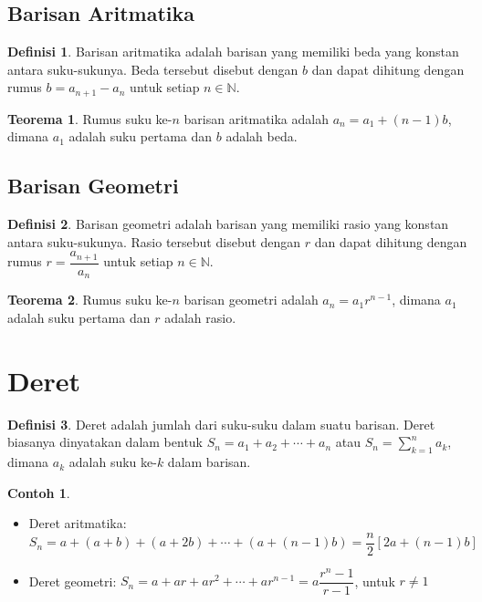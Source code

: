 \documentclass[aspectratio=169]{beamer}
\theoremstyle{definition}
\newtheorem{definisi}{Definisi}
\newtheorem{teorema}{Teorema}
\newtheorem{contoh}{Contoh}
\newcommand{\N}{\mathbb{N}}
\begin{document}
\subsection{Barisan Aritmatika}
\begin{frame}{\insertsection}{\insertsubsection}
  \begin{definisi}
    Barisan aritmatika adalah barisan yang memiliki beda yang konstan antara suku-sukunya. Beda tersebut disebut dengan $b$ dan dapat dihitung dengan rumus $b = a_{n+1} - a_n$ untuk setiap $n\in\N$.
  \end{definisi}
  \begin{teorema}
    Rumus suku ke-$n$ barisan aritmatika adalah $a_n = a_1 + (n-1)b$, dimana $a_1$ adalah suku pertama dan $b$ adalah beda.
  \end{teorema}
\end{frame}

\subsection{Barisan Geometri}
\begin{frame}{\insertsection}{\insertsubsection}
  \begin{definisi}
    Barisan geometri adalah barisan yang memiliki rasio yang konstan antara suku-sukunya. Rasio tersebut disebut dengan $r$ dan dapat dihitung dengan rumus $r = \dfrac{a_{n+1}}{a_n}$ untuk setiap $n\in\N$.
  \end{definisi}
  \begin{teorema}
    Rumus suku ke-$n$ barisan geometri adalah $a_n = a_1 r^{n-1}$, dimana $a_1$ adalah suku pertama dan $r$ adalah rasio.
  \end{teorema}
\end{frame}

\section{Deret}
\begin{frame}{\insertsection}
  \begin{definisi}
    Deret adalah jumlah dari suku-suku dalam suatu barisan. Deret biasanya dinyatakan dalam bentuk $S_n = a_1 + a_2 + \cdots + a_n$ atau $S_n = \sum_{k=1}^n a_k$, dimana $a_k$ adalah suku ke-$k$ dalam barisan.
  \end{definisi}
  \begin{contoh}
    \begin{itemize}
      \item Deret aritmatika: $S_n = a + (a + b) + (a + 2b) + \cdots + (a + (n-1)b)= \dfrac{n}{2}[2a + (n-1)b]$
      \item Deret geometri: $S_n = a + a r + a r^2 + \cdots + a r^{n-1} = a \dfrac{r^n - 1}{r - 1}$, untuk $r \neq 1$
    \end{itemize}
  \end{contoh}
\end{frame}
\end{document}
